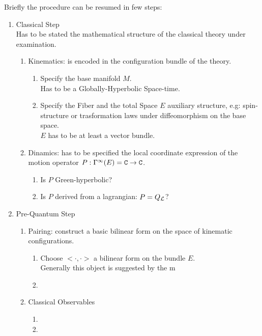 \documentclass[Main]{subfiles}
\begin{document}
	Briefly the procedure can be resumed in few steps:
 	\begin{enumerate}
   		\item Classical Step\\
   			Has to be stated the mathematical structure of the classical theory under examination.
   			\begin{enumerate}
   				\item Kinematics: is encoded in the configuration bundle of the theory.
   					\begin{enumerate}
   						\item Specify the base manifold $M$. \\Has to be a Globally-Hyperbolic Space-time.
   						\item Specify the Fiber and the total Space $E$ auxiliary structure, e.g: spin-structure or trasformation laws under diffeomorphism on the base space.\\$E$ has to be at least a vector bundle.
   					\end{enumerate}
   			
   				\item Dinamics: has to be specified the local coordinate expression of the motion operator $P: \Gamma^\infty (E)= \mathtt{C} \rightarrow \mathtt{C}$.
   				   	\begin{enumerate}
   						\item Is $P$ Green-hyperbolic?
   						\item Is $P$ derived from a lagrangian: $P=Q_{\mathcal{L}}$? 
   					\end{enumerate}
   			\end{enumerate}
   			
   		\item Pre-Quantum Step
   		   	\begin{enumerate}
   				\item Pairing: construct a basic bilinear form on the space of kinematic configurations.
   					\begin{enumerate}
   						\item Choose $<\cdot,\cdot>$ a bilinear form on the bundle $E$.\\ Generally this object is suggested by the m
   						\item
   					\end{enumerate}
   					
   				\item Classical Observables
   				   	\begin{enumerate}
   						\item
   						\item
   					\end{enumerate}
   				 

\end{enumerate}
\end{enumerate}
\end{document}
